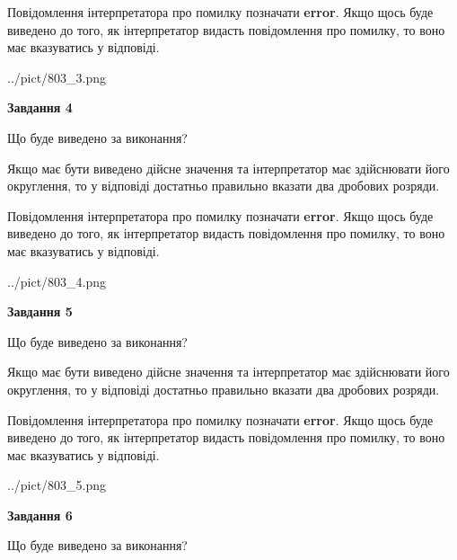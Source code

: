 \documentclass[12pt, ukrainian]{article}
\begin{document}
{\begin {Large}
Повідомлення інтерпретатора про помилку позначати \textbf{error}.
Якщо щось буде виведено до того, як інтерпретатор видасть повідомлення про помилку, 
то воно має вказуватись у відповіді. \par

\begin{center}
	{../pict/803_3.png}
\end{center}
\newpage

{\begin {center}\textbf{Завдання 4}\end {center}}\par
Що буде виведено за виконання? \par

Якщо має бути виведено дійсне значення та інтерпретатор має здійснювати його округлення, 
то у відповіді достатньо правильно вказати два дробових розряди.

Повідомлення інтерпретатора про помилку позначати \textbf{error}.
Якщо щось буде виведено до того, як інтерпретатор видасть повідомлення про помилку, 
то воно має вказуватись у відповіді. \par

\begin{center}
	{../pict/803_4.png}
\end{center}
\newpage

{\begin {center}\textbf{Завдання 5}\end {center}}\par
Що буде виведено за виконання? \par

Якщо має бути виведено дійсне значення та інтерпретатор має здійснювати його округлення, 
то у відповіді достатньо правильно вказати два дробових розряди.

Повідомлення інтерпретатора про помилку позначати \textbf{error}.
Якщо щось буде виведено до того, як інтерпретатор видасть повідомлення про помилку, 
то воно має вказуватись у відповіді. \par

\begin{center}
	{../pict/803_5.png}
\end{center}
\newpage

{\begin {center}\textbf{Завдання 6}\end {center}}\par
Що буде виведено за виконання? \par


\end{Large}}
\end{document}
